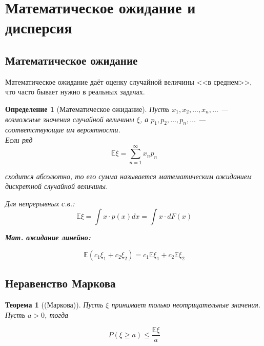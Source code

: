 \documentclass{article}
\theoremstyle{mydef}
\newtheorem{definition}{Определение}
\theoremstyle{myth}
\newtheorem{theorem}{Теорема}
\begin{document}
\section{Математическое ожидание и дисперсия}

\subsection{Математическое ожидание}

Математическое ожидание даёт оценку случайной величины <<в среднем>>, что часто бывает нужно в реальных задачах.

\begin{definition}[Математическое ожидание]
    Пусть $x_1, x_2, \ldots, x_n, \ldots$ --- возможные значения случайной величины $\xi$, а $p_1, p_2, \ldots, p_n, \ldots$ --- соответствующие им вероятности. \\
    Если ряд     
    \begin{equation}
        \mathbb{E} \xi = \sum_{n=1}^\infty x_n p_n   
    \end{equation}
    
    сходится абсолютно, то его сумма называется \textit{математическим ожиданием дискретной случайной величины}.

    Для непрерывных с.в.:
    \begin{equation}
        \mathbb{E}\xi = \int x \cdot p(x) dx = \int x \cdot d F(x)
    \end{equation}

    \textbf{Мат. ожидание линейно:}

    \begin{equation}
        \mathbb{E}(c_1 \xi_1 + c_2 \xi_2) = c_1 \mathbb{E} \xi_1 + c_2 \mathbb{E} \xi_2 
    \end{equation}
\end{definition}

\subsection{Неравенство Маркова}

\begin{theorem}[(Маркова)]
    Пусть $\xi$ принимает только неотрицательные значения. Пусть $a > 0$, тогда

\begin{equation}
    P(\xi \geq a) \leq \frac{\mathbb{E}\xi}{a}
\end{equation}
\end{theorem}
\end{document}
